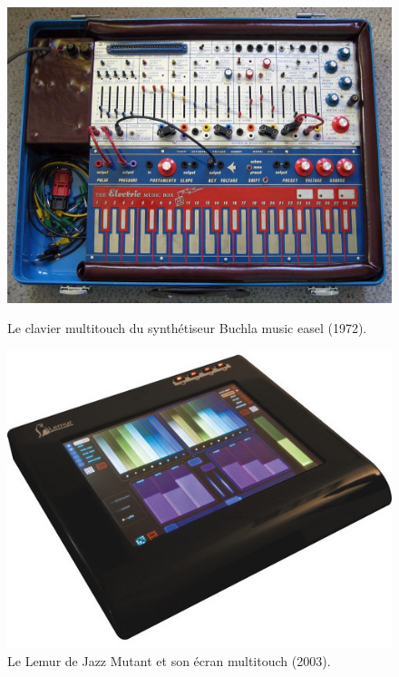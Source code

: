 \begin{figure}[!htbp]
	\captionsetup{format=plain}%
	\centering
	\begin{minipage}[t]{0.48\textwidth}
		\includegraphics[width=\linewidth]{gfx/06_visual_representation/Buchla_music_easel.jpg}
		\caption[Le clavier multitouch du synthétiseur Buchla music easel]{Le clavier multitouch du synthétiseur Buchla music easel (1972).}
		\label{fig:visual_representation:buchla}
	\end{minipage}
	\hspace{.02\linewidth}
	\begin{minipage}[t]{0.48\textwidth}
	    \includegraphics[width=\linewidth]{gfx/06_visual_representation/Lemur.jpg}
		\caption[Le Lemur de Jazz Mutant et son écran multitouch]{Le Lemur de Jazz Mutant et son écran multitouch (2003).}
		\label{fig:visual_representation:lemur}
	\end{minipage}
\end{figure}
